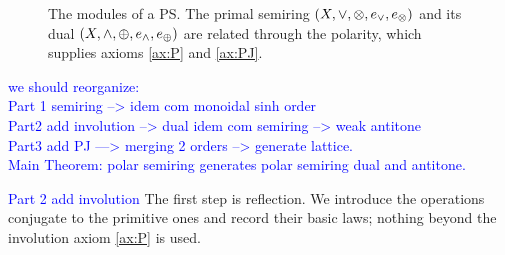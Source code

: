 \begin{figure}[ht]
\centering
{}
\caption{The modules of a PS. The primal semiring
$(X,\vee,\otimes,e_{\vee},e_{\otimes})$ and its dual $(X,\wedge,\oplus,e_{\wedge},e_{\oplus})$ are
related through the polarity, which supplies axioms \eqref{ax:P} and
\eqref{ax:PJ}.}
\label{fig:architecture}
\end{figure}




\textcolor{blue}{we should reorganize:\\
Part 1 semiring --> idem com monoidal sinh order\\
Part2 add involution --> dual idem com semiring --> weak antitone\\
Part3 add PJ ---> merging 2 orders --> generate lattice.\\
Main Theorem: polar semiring generates polar semiring dual and antitone.}




\textcolor{blue}{Part 2 add involution}
The first step is reflection. We introduce the operations conjugate to the
primitive ones and record their basic laws; nothing beyond the involution
axiom \eqref{ax:P} is used.

